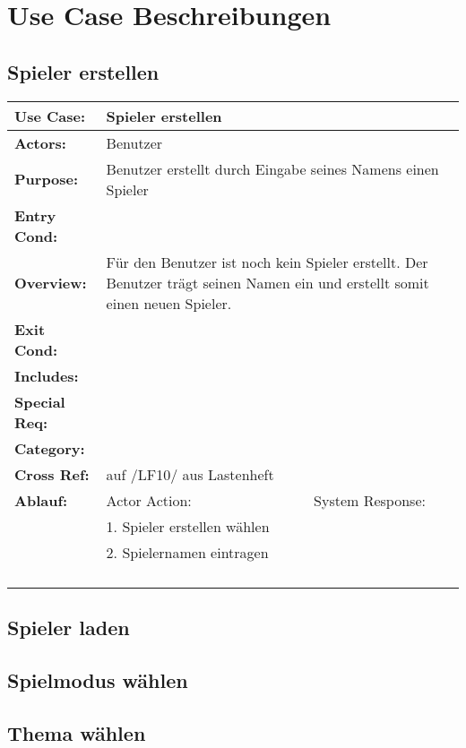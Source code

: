 \clearpage

\chapter{Use Case Beschreibungen}


\section{Spieler erstellen}
\begin{tabular}{|l|l|l|l|l|l|l|}
\hline
\textbf{Use Case:} & \multicolumn{ 6}{l|}{Spieler erstellen} \\ \hline
\textbf{Actors:} & \multicolumn{ 6}{l|}{Benutzer} \\ \hline
\textbf{Purpose:} & \multicolumn{ 6}{l|}{Benutzer erstellt durch Eingabe seines Namens einen Spieler} \\ \hline
\textbf{Entry Cond:} & \multicolumn{ 6}{c|}{} \\ \hline
\textbf{Overview:} & \multicolumn{ 6}{l|}{Für den Benutzer ist noch kein Spieler erstellt. Der Benutzer trägt seinen Namen ein 
und erstellt somit einen neuen Spieler.} \\ \hline
\textbf{Exit Cond:} & \multicolumn{ 6}{l|}{} \\ \hline
\textbf{Includes:} & \multicolumn{ 6}{l|}{} \\ \hline
\textbf{Special Req:} & \multicolumn{ 6}{l|}{} \\ \hline
\textbf{Category:} & \multicolumn{ 6}{l|}{} \\ \hline
\textbf{Cross Ref:} & \multicolumn{ 6}{l|}{auf /LF10/ aus Lastenheft} \\ \hline
\textbf{Ablauf:} & \multicolumn{ 3}{l|}{Actor Action:} & \multicolumn{ 3}{l|}{System Response:} \\ \hline
\multicolumn{ 1}{|c|}{} & \multicolumn{ 3}{l|}{1. Spieler erstellen wählen} & \multicolumn{ 3}{l|}{} \\ \cline{ 2- 7}
\multicolumn{ 1}{|l|}{} & \multicolumn{ 3}{l|}{2. Spielernamen eintragen} & \multicolumn{ 3}{l|}{} \\ \cline{ 2- 7}
\multicolumn{ 1}{|l|}{} & \multicolumn{ 3}{l|}{} & \multicolumn{ 3}{l|}{} \\ \cline{ 2- 7}
\multicolumn{ 1}{|l|}{} & \multicolumn{ 3}{l|}{} & \multicolumn{ 3}{l|}{} \\ \cline{ 2- 7}
\multicolumn{ 1}{|l|}{} & \multicolumn{ 3}{l|}{} & \multicolumn{ 3}{l|}{} \\ \cline{ 2- 7}
\multicolumn{ 1}{|l|}{} & \multicolumn{ 3}{l|}{} & \multicolumn{ 3}{l|}{} \\ \hline
\end{tabular}


\clearpage
\section{Spieler laden}

\clearpage
\section{Spielmodus wählen}

\clearpage
\section{Thema wählen}
